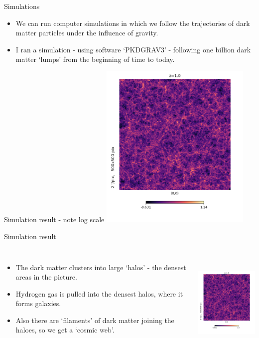 \documentclass[usenames,dvipsnames]{beamer}
\begin{document}
\begin{frame}{Simulations}
  \begin{block}{}
    \begin{itemize}
      \item{We can run computer simulations in which we follow the trajectories of dark matter particles under the influence of gravity.}
	\item{I ran a simulation - using software `PKDGRAV3' - following one billion dark matter `lumps'  from the beginning of time to today.}
    \end{itemize}
  \end{block}
\end{frame}

\begin{frame}{Simulation result - note log scale}
    \centering
    \includegraphics[height=8cm]{simulation_z_1.png}
\end{frame}
  

\begin{frame}{Simulation result}
  \begin{columns}
    \begin{itemize}
      \item{The dark matter clusters into large `halos' - the densest areas in the picture.}
      \item{Hydrogen gas is pulled into the densest halos, where it forms galaxies.}
	\item{Also there are `filaments' of dark matter joining the haloes, so we get a `cosmic web'.}
    \end{itemize}
    \centering
    \includegraphics[height=5cm]{simulation_z_1.png}
  \end{columns}
\end{frame}
\end{document}
